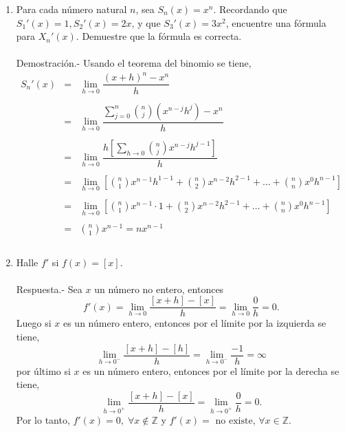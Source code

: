 \begin{enumerate}[\bfseries 1]
    \item Para cada número natural $n$, sea $S_n(x)=x^n$. Recordando que $S_1'(x)=1, S_2'(x)=2x$, y que $S_3'(x)=3x^2$, encuentre una fórmula para $X_n'(x)$. Demuestre que la fórmula es correcta.\\\\
	Demostración.-\; Usando el teorema del binomio se tiene,
	$$\begin{array}{rcl}
	    S_n'(x)&=& \displaystyle\lim_{h\to 0}\dfrac{(x+h)^n-x^n}{h}\\\\
		   &=&\displaystyle\lim_{h\to 0} \dfrac{\displaystyle\sum_{j=0}^n {n\choose j} \left(x^{n-j} h^{j}\right)-x^n}{h}\\\\
		   &=&\displaystyle \lim_{h\to 0}\dfrac{h\left[\displaystyle\sum_{h\to 0}{n\choose j} x^{n-j}h^{j-1}\right]}{h}\\\\
		   &=&\displaystyle \lim_{h\to 0}\left[{n\choose 1}x^{n-1}h^{1-1}+{n\choose 2}x^{n-2}h^{2-1}+\ldots + {n\choose n}x^{0}h^{n-1}\right]\\\\
		   &=&\displaystyle \lim_{h\to 0}\left[{n\choose 1}x^{n-1}\cdot 1+{n\choose 2}x^{n-2}h^{2-1}+\ldots + {n\choose n}x^{0}h^{n-1}\right]\\\\
		   &=&\displaystyle{n\choose 1}x^{n-1} = nx^{n-1}\\\\
       \end{array}$$

   \item Halle $f'$ si $f(x)=[x]$.\\\\
       Respuesta.-\; Sea $x$ un número no entero, entonces
       $$f'(x)=\lim_{h\to 0} \dfrac{[x+h]-[x]}{h}=\lim_{h\to 0}\dfrac{0}{h}=0.$$
       Luego si $x$ es un número entero, entonces por el límite por la izquierda se tiene,
       $$\lim_{h\to 0^-}\dfrac{[x+h]-[h]}{h}=\lim_{h\to 0^-}\dfrac{-1}{h}=\infty$$
       por último si $x$ es un número entero, entonces por el límite por la derecha se tiene,
       $$\lim_{h\to 0^+}\dfrac{[x+h]-[x]}{h}=\lim_{h\to 0^+}\dfrac{0}{h}=0.$$
       Por lo tanto, $f'(x)=0, \; \forall x \notin \mathbb{Z}$ y $f'(x)=\mbox{ no existe, } \forall x\in \mathbb{Z}$.\\\\


\end{enumerate}
